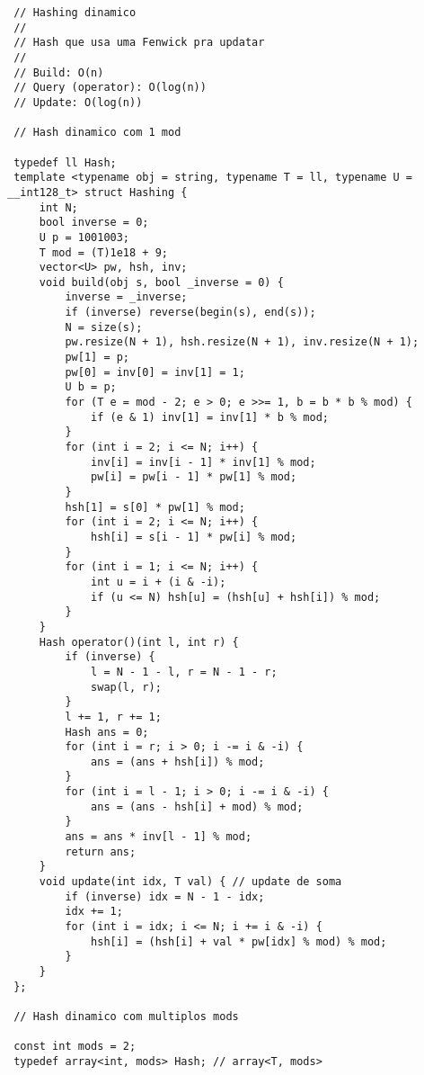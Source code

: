 \documentclass[11pt, a4paper, twoside]{article}
\begin{document}
\begin{lstlisting}
 // Hashing dinamico
 //
 // Hash que usa uma Fenwick pra updatar
 //
 // Build: O(n)
 // Query (operator): O(log(n))
 // Update: O(log(n))
 
 // Hash dinamico com 1 mod
 
 typedef ll Hash; 
 template <typename obj = string, typename T = ll, typename U = __int128_t> struct Hashing {
     int N;
     bool inverse = 0;
     U p = 1001003;
     T mod = (T)1e18 + 9;
     vector<U> pw, hsh, inv;
     void build(obj s, bool _inverse = 0) {
         inverse = _inverse;
         if (inverse) reverse(begin(s), end(s));
         N = size(s);
         pw.resize(N + 1), hsh.resize(N + 1), inv.resize(N + 1);
         pw[1] = p;
         pw[0] = inv[0] = inv[1] = 1;
         U b = p;
         for (T e = mod - 2; e > 0; e >>= 1, b = b * b % mod) {
             if (e & 1) inv[1] = inv[1] * b % mod;
         }
         for (int i = 2; i <= N; i++) {
             inv[i] = inv[i - 1] * inv[1] % mod;
             pw[i] = pw[i - 1] * pw[1] % mod;
         }
         hsh[1] = s[0] * pw[1] % mod;
         for (int i = 2; i <= N; i++) {
             hsh[i] = s[i - 1] * pw[i] % mod;
         }
         for (int i = 1; i <= N; i++) {
             int u = i + (i & -i);
             if (u <= N) hsh[u] = (hsh[u] + hsh[i]) % mod;
         }
     }
     Hash operator()(int l, int r) {
         if (inverse) {
             l = N - 1 - l, r = N - 1 - r;
             swap(l, r);
         }
         l += 1, r += 1;
         Hash ans = 0;
         for (int i = r; i > 0; i -= i & -i) {
             ans = (ans + hsh[i]) % mod;
         }
         for (int i = l - 1; i > 0; i -= i & -i) {
             ans = (ans - hsh[i] + mod) % mod;
         }
         ans = ans * inv[l - 1] % mod;
         return ans;
     }
     void update(int idx, T val) { // update de soma
         if (inverse) idx = N - 1 - idx;
         idx += 1;
         for (int i = idx; i <= N; i += i & -i) {
             hsh[i] = (hsh[i] + val * pw[idx] % mod) % mod;
         }
     }
 };
 
 // Hash dinamico com multiplos mods
 
 const int mods = 2;
 typedef array<int, mods> Hash; // array<T, mods>
  

\end{lstlisting}
\end{document}
